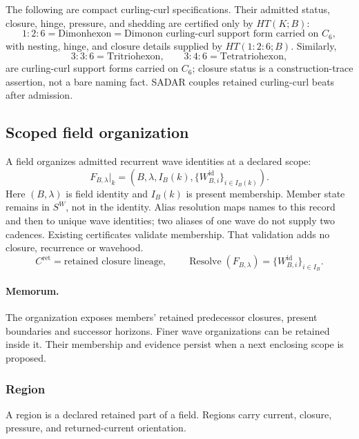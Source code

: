 The following are compact curling-curl specifications. Their admitted status, closure, hinge, pressure, and shedding are certified only by \(HT(K;B)\):
\[
1{:}2{:}6=\text{Dimonhexon}
=\text{Dimonon curling-curl support form carried on }C_6,
\]
with nesting, hinge, and closure details supplied by \(HT(1{:}2{:}6;B)\). Similarly,
\[
3{:}3{:}6=\text{Tritriohexon},
\qquad
3{:}4{:}6=\text{Tetratriohexon},
\]
are curling-curl support forms carried on \(C_6\); closure status is a construction-trace assertion, not a bare naming fact. SADAR couples retained curling-curl beats after admission.


\subsection{Scoped field organization}
\label{sec:field}
\label{sec:field-disposition}
\label{subsec:declared-field-choice}
A field organizes admitted recurrent wave identities at a declared scope:
\begin{equation}
F_{B,\lambda}|_k=(B,\lambda,I_B(k),
\{W^{\mathrm{id}}_{B,i}\}_{i\in I_B(k)}).
\label{eq:field-organization}
\end{equation}
Here \((B,\lambda)\) is field identity and \(I_B(k)\) is present membership.
Member state remains in \(S^W\), not in the identity. Alias resolution maps
names to this record and then to unique wave identities; two aliases of one
wave do not supply two cadences. Existing certificates validate membership.
That validation adds no closure, recurrence or wavehood.
\begin{equation}
C^{\mathrm{ret}}=\text{retained closure lineage},\qquad
\operatorname{Resolve}(F_{B,\lambda})=\{W^{\mathrm{id}}_{B,i}\}_{i\in I_B}.
\label{eq:retained-lineage-field-separation}
\end{equation}
\paragraph{Memorum.}
\label{subsec:field-memorum}
The organization exposes members' retained predecessor closures, present
boundaries and successor horizons. Finer wave organizations can be retained
inside it. Their membership and evidence persist when a next enclosing scope
is proposed.
\subsubsection{Region}
\label{subsec:field-region}
\begin{definition}[Region]
A region is a declared retained part of a field. Regions carry current, closure, pressure, and returned-current orientation.
\end{definition}

